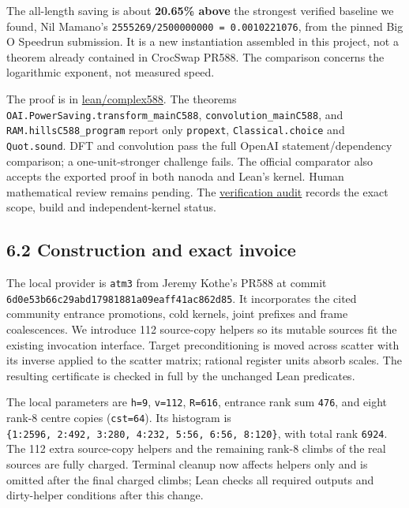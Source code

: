 \documentclass[
  11pt,
]{article}
\begin{document}
The all-length saving is about \textbf{20.65\% above} the strongest
verified baseline we found, Nil Mamano's
\texttt{2555269/\allowbreak{}2500000000\ =\ 0.0010221076}, from the pinned Big O
Speedrun submission. It is a new instantiation assembled in this
project, not a theorem already contained in CrocSwap PR588. The
comparison concerns the logarithmic exponent, not measured speed.

The proof is in \href{../lean/complex588/}{lean/complex588}. The
theorems \texttt{OAI.PowerSaving.transform\_mainC588},
\texttt{convolution\_mainC588}, and \texttt{RAM.hillsC588\_program}
report only \texttt{propext}, \texttt{Classical.choice} and
\texttt{Quot.sound}. DFT and convolution pass the full OpenAI
statement/dependency comparison; a one-unit-stronger challenge fails.
The official comparator also accepts the exported proof in both nanoda
and Lean's kernel. Human mathematical review remains pending. The
\href{../verification/COMPLEX588_AUDIT.md}{verification audit} records
the exact scope, build and independent-kernel status.

\subsection{6.2 Construction and exact
invoice}\label{construction-and-exact-invoice}

The local provider is \texttt{atm3} from Jeremy Kothe's PR588 at commit
\texttt{6d0e53b66c\allowbreak{}29abd17981\allowbreak{}881a09eaff\allowbreak{}41ac862d85}. It incorporates the
cited community entrance promotions, cold kernels, joint prefixes and
frame coalescences. We introduce 112 source-copy helpers so its mutable
sources fit the existing invocation interface. Target preconditioning is
moved across scatter with its inverse applied to the scatter matrix;
rational register units absorb scales. The resulting certificate is
checked in full by the unchanged Lean predicates.

The local parameters are \texttt{h=9}, \texttt{v=112}, \texttt{R=616},
entrance rank sum \texttt{476}, and eight rank-8 centre copies
(\texttt{cst=64}). Its histogram is
\texttt{\{1:2596,\ 2:492,\ 3:280,\ 4:232,\ 5:56,\ 6:56,\ 8:120\}}, with
total rank \texttt{6924}. The 112 extra source-copy helpers and the
remaining rank-8 climbs of the real sources are fully charged. Terminal
cleanup now affects helpers only and is omitted after the final charged
climbs; Lean checks all required outputs and dirty-helper conditions
after this change.
\end{document}
